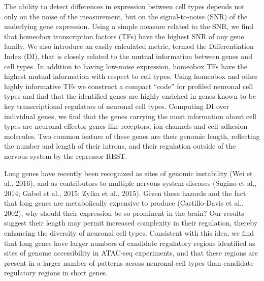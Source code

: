 The ability to detect differences in expression between cell types depends not only on the noise of the measurement, but on the signal-to-noise (SNR) of the underlying gene expression. Using a simple measure related to the SNR, we find that homeobox transcription factors (TFs) have the highest SNR of any gene family. We also introduce an easily calculated metric, termed the Differentiation Index (DI), that is closely related to the mutual information between genes and cell types. In addition to having low-noise expression, homeobox TFs have the highest mutual information with respect to cell types. Using homeobox and other highly informative TFs we construct a compact “code” for profiled neuronal cell types and find that the identified genes are highly enriched in genes known to be key transcriptional regulators of neuronal cell types.
Computing DI over individual genes, we find that the genes carrying the most information about cell types are neuronal effector genes like receptors, ion channels and cell adhesion molecules. Two common feature of these genes are their genomic length, reflecting the number and length of their introns, and their regulation outside of the nervous system by the repressor REST.

Long genes have recently been recognized as sites of genomic instability (Wei et al., 2016), and as contributors to multiple nervous system diseases (Sugino et al., 2014; Gabel et al., 2015; Zylka et al., 2015). Given these hazards and the fact that long genes are metabolically expensive to produce (Castillo-Davis et al., 2002), why should their expression be so prominent in the brain? Our results suggest their length may permit increased complexity in their regulation, thereby enhancing the diversity of neuronal cell types. Consistent with this idea, we find that long genes have larger numbers of candidate regulatory regions identified as sites of genome accessibility in ATAC-seq experiments, and that these regions are present in a larger number of patterns across neuronal cell types than candidate regulatory regions in short genes.
 